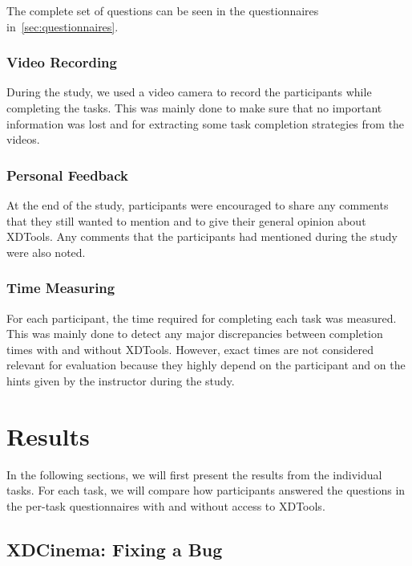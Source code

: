 The complete set of questions can be seen in the questionnaires in~\ref{sec:questionnaires}.

\subsubsection{Video Recording}
During the study, we used a video camera to record the participants while completing the tasks. This was mainly done to make sure that no important information was lost and for extracting some task completion strategies from the videos.

\subsubsection{Personal Feedback}
At the end of the study, participants were encouraged to share any comments that they still wanted to mention and to give their general opinion about XDTools. Any comments that the participants had mentioned during the study were also noted.

\subsubsection{Time Measuring}
For each participant, the time required for completing each task was measured. This was mainly done to detect any major discrepancies between completion times with and without XDTools. However, exact times are not considered relevant for evaluation because they highly depend on the participant and on the hints given by the instructor during the study.

\section{Results}

In the following sections, we will first present the results from the individual tasks. For each task, we will compare how participants answered the questions in the per-task questionnaires with and without access to XDTools. 

\subsection{XDCinema: Fixing a Bug}

